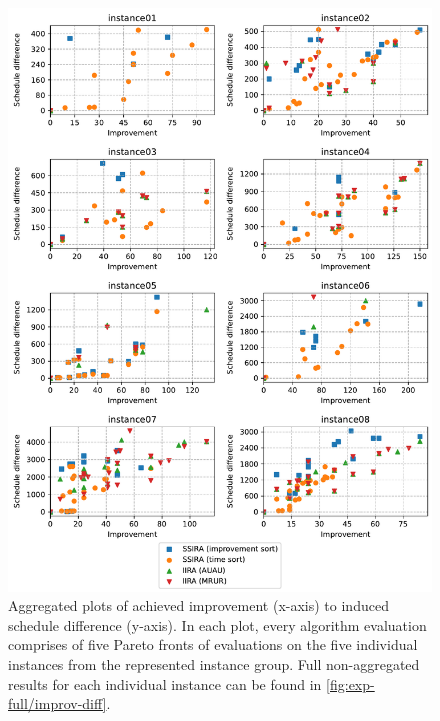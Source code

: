 \begin{figure}[p]
    \centering
    \includegraphics[width=\textwidth]{img/exp_aggregated_improv_diff.pdf}
    \caption{
        Aggregated plots of achieved improvement (x-axis) to induced schedule difference (y-axis).
        In each plot, every algorithm evaluation comprises of five Pareto fronts of evaluations
        on the five individual instances from the represented instance group.
        Full non-aggregated results for each individual instance can be found in \cref{fig:exp-full/improv-diff}.
        }
    \label{fig:exp/improv-diff}
\end{figure}

